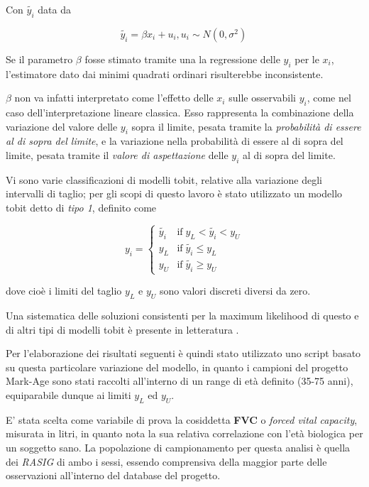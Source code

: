 \documentclass[12pt,openright,twoside,a4paper]{book}
\begin{document}
Con $\tilde{y_i}$ data da

\begin{equation}
\tilde{y_i} = \beta x_i + u_i, u_i \sim N(0,\sigma^2) \,
\end{equation}

Se il parametro $\beta$ fosse stimato tramite una la regressione delle $y_i$ per le $x_i$, l'estimatore dato dai minimi quadrati ordinari risulterebbe inconsistente.

$\beta$ non va infatti interpretato come l'effetto delle $x_i$ sulle osservabili $y_i$, come nel caso dell'interpretazione lineare classica.
Esso rappresenta la combinazione della variazione del valore delle $y_i$ sopra il limite, pesata tramite la \textit{probabilità di essere al di sopra del limite}, e la variazione nella probabilità di essere al di sopra del limite, pesata tramite il \textit{valore di aspettazione} delle $y_i$ al di sopra del limite. \cite{tobit}

Vi sono varie classificazioni di modelli tobit, relative alla variazione degli intervalli di taglio; per gli scopi di questo lavoro è stato utilizzato un modello tobit detto di \textit{tipo 1}, definito come

\begin{equation}
 y_i = \begin{cases}
   \tilde{y_i} & \textrm{if} \; y_L<\tilde{y_i}<y_U \\
    y_L   & \textrm{if} \; \tilde{y_i} \leq y_L \\
    y_U   & \textrm{if} \; \tilde{y_i} \geq y_U
\end{cases}
\end{equation}

dove cioè i limiti del taglio $y_L$ e $y_U$ sono valori discreti diversi da zero.

Una sistematica delle soluzioni consistenti per la maximum likelihood di questo e di altri tipi di modelli tobit è presente in letteratura \cite{tobitMLE}.

Per l'elaborazione dei risultati seguenti è quindi stato utilizzato uno script basato su questa particolare variazione del modello, in quanto i campioni del progetto Mark-Age sono stati raccolti all'interno di un range di età definito (35-75 anni), equiparabile dunque ai limiti $y_L$ ed $y_U$.

E' stata scelta come variabile di prova la cosiddetta \textbf{FVC} o \textit{forced vital capacity}, misurata in litri, in quanto nota la sua relativa correlazione con l'età biologica per un soggetto sano.
La popolazione di campionamento per questa analisi è quella dei \textit{RASIG} di ambo i sessi, essendo comprensiva della maggior parte delle osservazioni all'interno del database del progetto.
\end{document}
